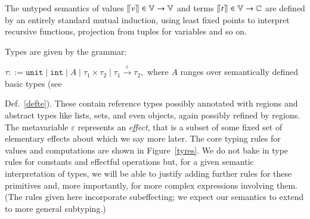 \documentclass[orivec]{llncs}
\newif\iffull\fullfalse
\renewcommand{\paragraph}[1]{\noindent {\bf #1}}
\newcommand{\keywd}[1]{\mathtt{#1}}
\newcommand{\effto}[1]{\stackrel{#1}{\to}}
\newcommand{\inttype}{\keywd{int}}
\newcommand{\unittype}{\keywd{unit}}
\newcommand{\squelch}[1]{}
\newcommand{\eff}{\varepsilon}
\newcommand{\semV}[1]{\ensuremath{\llceil {#1} \rrceil
}}
\newcommand{\Values}{\mathbb{V}}
\newcommand{\Comps}{\mathbb{C}}
\begin{document}
\paragraph{Semantics}
The untyped semantics of values $\semV{v}\in\Values\rightarrow\Values$
and terms $\semV{t}\in\Values\rightarrow\Comps$ are defined by an
entirely standard mutual induction, using least fixed points to
interpret recursive functions, projection from tuples for variables
and so on.
\squelch{
are given by
the recursive clauses in Figure~\ref{seme}; note the overloading of
semantic brackets for constants, values and computations. 
The notation
$\eta(x)$ stands for the $i$-th projection from $\eta\in\Values$
if $x$ is $x_i$ and $\eta[x{\mapsto}v]$ (functionally) updates the
$i$-th slot in $\eta$ when $x=x_i$.
}

\paragraph{Types}
Types are given by the grammar:
\iffull
\[
\tau ::= \unittype \mid \inttype\mid A\mid\tau_1\times\tau_2\mid 
\tau_1\effto\eff \tau_2
\]
where $A$ ranges over semantically defined basic types (see
\else
$
\tau ::= \unittype \mid \inttype\mid A\mid\tau_1\times\tau_2\mid 
\tau_1\effto\eff \tau_2,
$
where $A$ ranges over semantically defined basic types (see
\fi
Def.~\ref{defte}). These contain reference types possibly
annotated with regions and abstract types like lists, sets, and even
objects, again possibly refined by regions. The metavariable $\eff$
represents an \emph{effect}, that is a subset of some fixed set of
elementary effects about which we say more later. The core typing
rules for values and computations are shown in
Figure~\ref{tyres}. We do not bake in type rules for
constants and effectful operations but, for a given semantic interpretation
of types, we will be able to justify adding further rules for these
primitives and, more importantly, for more complex expressions
involving them. (The rules given here incorporate
subeffecting; we expect our semantics to extend
to more general subtyping.)
\end{document}
